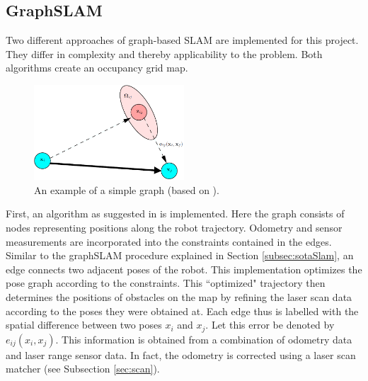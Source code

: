 \documentclass{ba-kecs}
\begin{document}
\subsection{GraphSLAM}
\label{sec:implSLAM}
Two different approaches of graph-based SLAM are implemented for this project. They differ in complexity and thereby applicability to the problem. Both algorithms create an occupancy grid map. 
\begin{figure}[h]
	\centering
		\includegraphics[width=0.50\textwidth]{figures/graph.png}
	\caption{An example of a simple graph (based on \citep{Grisetti}).}
	\label{fig:turtlebotexample_graph}
\end{figure}
First, an algorithm as suggested in \citep{Grisetti} is implemented. Here the graph consists of nodes representing positions along the robot trajectory. Odometry and sensor measurements are incorporated into the constraints contained in the edges. Similar to the graphSLAM procedure explained in Section \ref{subsec:sotaSlam}, an edge connects two adjacent poses of the robot. This implementation optimizes the pose graph according to the constraints. This ``optimized" trajectory then determines the positions of obstacles on the map by refining the laser scan data according to the poses they were obtained at. Each edge thus is labelled with the spatial difference between two poses \(x_i\) and \(x_j\). Let this error be denoted by \(e_{ij}(x_i, x_j)\). This information is obtained from a combination of odometry data and laser range sensor data. In fact, the odometry is corrected using a laser scan matcher (see Subsection \ref{sec:scan}). 
\end{document}
